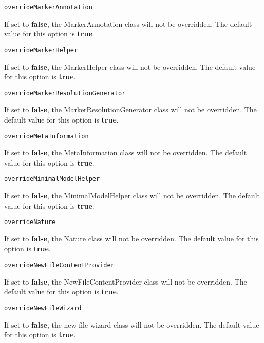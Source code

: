 \noindent\texttt{overrideMarkerAnnotation}
\begin{myindentpar}{1cm}
If set to \textbf{false}, the MarkerAnnotation class will not be overridden. The default value for this option is \textbf{true}.
\end{myindentpar}

\noindent\texttt{overrideMarkerHelper}
\begin{myindentpar}{1cm}
If set to \textbf{false}, the MarkerHelper class will not be overridden. The default value for this option is \textbf{true}.
\end{myindentpar}

\noindent\texttt{overrideMarkerResolutionGenerator}
\begin{myindentpar}{1cm}
If set to \textbf{false}, the MarkerResolutionGenerator class will not be overridden. The default value for this option is \textbf{true}.
\end{myindentpar}

\noindent\texttt{overrideMetaInformation}
\begin{myindentpar}{1cm}
If set to \textbf{false}, the MetaInformation class will not be overridden. The default value for this option is \textbf{true}.
\end{myindentpar}

\noindent\texttt{overrideMinimalModelHelper}
\begin{myindentpar}{1cm}
If set to \textbf{false}, the MinimalModelHelper class will not be overridden. The default value for this option is \textbf{true}.
\end{myindentpar}

\noindent\texttt{overrideNature}
\begin{myindentpar}{1cm}
If set to \textbf{false}, the Nature class will not be overridden. The default value for this option is \textbf{true}.
\end{myindentpar}

\noindent\texttt{overrideNewFileContentProvider}
\begin{myindentpar}{1cm}
If set to \textbf{false}, the NewFileContentProvider class will not be overridden. The default value for this option is \textbf{true}.
\end{myindentpar}

\noindent\texttt{overrideNewFileWizard}
\begin{myindentpar}{1cm}
If set to \textbf{false}, the new file wizard class will not be overridden. The default value for this option is \textbf{true}.
\end{myindentpar}

